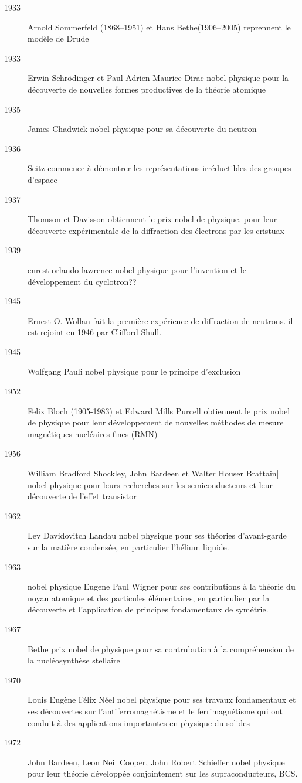 \begin{description}
\item[1933] Arnold Sommerfeld (1868--1951) et Hans Bethe(1906--2005) reprennent le modèle de Drude
\item[1933] Erwin Schrödinger et Paul Adrien Maurice Dirac nobel physique pour la découverte de nouvelles formes productives de la théorie atomique
\item[1935] James Chadwick nobel physique pour sa découverte du neutron
\item[1936] Seitz commence à démontrer les représentations irréductibles des groupes d'espace
\item[1937] Thomson et Davisson obtiennent le prix nobel de physique. pour leur découverte expérimentale de la diffraction des électrons par les cristuax
\item[1939] enrest orlando lawrence nobel physique pour l'invention et le développement du cyclotron??
\item[1945] Ernest O. Wollan fait la première expérience de diffraction de neutrons. il est rejoint en 1946 par Clifford Shull.
\item[1945] Wolfgang Pauli nobel physique pour le principe d'exclusion
\item[1952] Felix Bloch (1905-1983) et Edward Mills Purcell obtiennent le prix nobel de physique pour leur développement de nouvelles méthodes de mesure magnétiques nucléaires fines (RMN)
\item[1956] William Bradford Shockley, John Bardeen et Walter Houser Brattain] nobel physique pour leurs recherches sur les semiconducteurs et leur découverte de l'effet transistor
\item[1962] Lev Davidovitch Landau nobel physique pour ses théories d'avant-garde sur la matière condensée, en particulier l'hélium liquide.
\item[1963] nobel physique Eugene Paul Wigner pour ses contributions à la théorie du noyau atomique et des particules élémentaires, en particulier par la découverte et l'application de principes fondamentaux de symétrie.
\item[1967] Bethe prix nobel de physique pour sa contrubution à la compréhension de la nucléosynthèse stellaire
\item[1970] Louis Eugène Félix Néel nobel physique pour ses travaux fondamentaux et ses découvertes sur l'antiferromagnétisme et le ferrimagnétisme qui ont conduit à des applications importantes en physique du solides
\item[1972] John Bardeen, Leon Neil Cooper, John Robert Schieffer nobel physique pour leur théorie développée conjointement sur les supraconducteurs, BCS.

\end{description}
